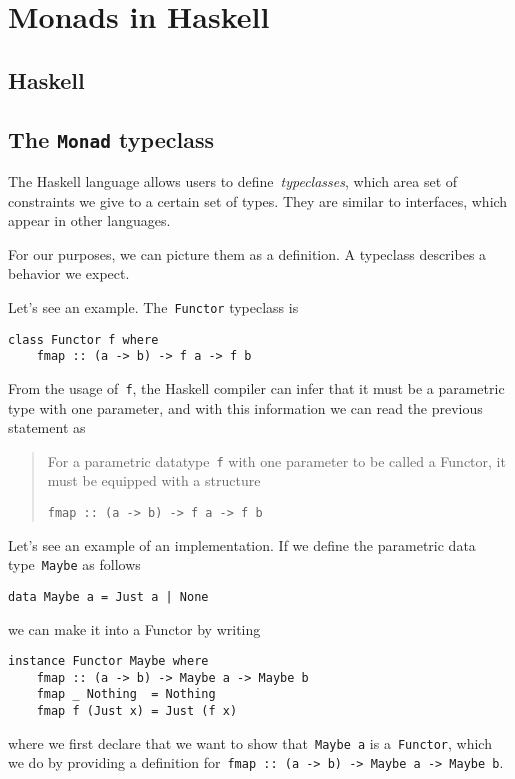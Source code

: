 \documentclass[a4paper]{article}
\theoremstyle{plain}
\theoremstyle{definition}
\begin{document}
\section{Monads in Haskell}
\subsection{Haskell}
\subsection{The \texorpdfstring{\texttt{Monad}}{Monad} typeclass}
The Haskell language allows users to define~\emph{typeclasses}, which area set
of constraints we give to a certain set of types.
They are similar to interfaces, which appear in other languages.

For our purposes, we can picture them as a definition. A typeclass describes a
behavior we expect.

Let's see an example. The~\texttt{Functor} typeclass is
\begin{verbatim}
class Functor f where
    fmap :: (a -> b) -> f a -> f b
\end{verbatim}
From the usage of~\texttt{f}, the Haskell compiler can infer
that it must be a parametric type with one parameter, and
with this information we can read the previous statement as
\begin{quote}
    For a parametric datatype~\texttt{f} with one parameter to be
    called a Functor, it must be equipped with a structure

    \texttt{fmap :: (a -> b) -> f a -> f b}
\end{quote}

Let's see an example of an implementation. If we define the parametric data
type~\texttt{Maybe} as follows
\begin{verbatim}
data Maybe a = Just a | None
\end{verbatim}
we can make it into a Functor by writing
\begin{verbatim}
instance Functor Maybe where
    fmap :: (a -> b) -> Maybe a -> Maybe b
    fmap _ Nothing  = Nothing
    fmap f (Just x) = Just (f x)
\end{verbatim}
where we first declare that we want to show that~\texttt{Maybe a}
is a~\texttt{Functor}, which we do by providing a definition
for~\texttt{fmap :: (a -> b) -> Maybe a -> Maybe b}.
\end{document}
